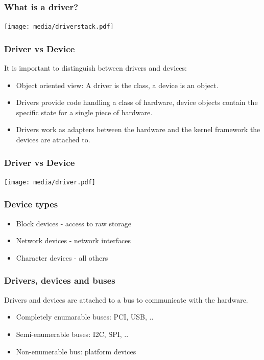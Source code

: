 \documentclass{beamer}
\begin{document}
\begin{frame}
\frametitle{What is a driver?}
\begin{center}
\texttt{[image: media/driverstack.pdf]}
\end{center}
\end{frame}

\begin{frame}
\frametitle{Driver vs Device}
It is important to distinguish between drivers and devices:
\begin{itemize}
	\item Object oriented view: A driver is the class, a device is an object.
	\item Drivers provide code handling a class of hardware, device objects contain the specific state for a single piece of hardware.
	\item Drivers work as adapters between the hardware and the kernel framework the devices are attached to.
\end{itemize}
\end{frame}

\begin{frame}
\frametitle{Driver vs Device}
\begin{center}
\texttt{[image: media/driver.pdf]}
\end{center}
\end{frame}

\begin{frame}
\frametitle{Device types}
\begin{itemize}
	\item Block devices - access to raw storage
	\item Network devices - network interfaces
	\item Character devices - all others
\end{itemize}


\end{frame}

\begin{frame}
\frametitle{Drivers, devices and buses}
Drivers and devices are attached to a bus to communicate with the hardware.
\begin{itemize}
	\item Completely enumarable buses: PCI, USB, ..
	\item Semi-enumerable buses: I2C, SPI, ..
	\item Non-enumerable bus: platform devices
\end{itemize}
\end{frame}
\end{document}
